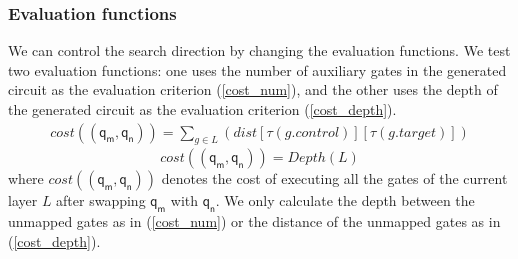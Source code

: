 \documentclass[journal]{IEEEtran}
\begin{document}
\subsubsection{Evaluation functions}
We can control the search direction by changing the evaluation functions.
We test two evaluation functions: one uses the number of auxiliary gates in the generated circuit as the evaluation criterion (\ref{cost_num}),  and the other uses the depth of the generated circuit as the evaluation criterion  (\ref{cost_depth}).
\begin{equation}
	 	\begin{aligned}
	cost((\textsf{q}_\textsf{m},\textsf{q}_\textsf{n}))=\sum_{g \in L}(dist[\tau(g.control)][\tau(g.target)])
    \label{cost_num}
         \end{aligned}
\end{equation}
	\begin{equation}
		cost((\textsf{q}_\textsf{m},\textsf{q}_\textsf{n}))= Depth(L)
		\label{cost_depth}
		\end{equation}
where $cost((\textsf{q}_\textsf{m},\textsf{q}_\textsf{n}))$ denotes the cost of executing all the gates of the current layer $L$ 
after swapping $\textsf{q}_\textsf{m}$ with $\textsf{q}_\textsf{n}$. We only calculate the depth between the unmapped gates as in (\ref{cost_num}) or the distance of the unmapped gates as in (\ref{cost_depth}).
\end{document}
